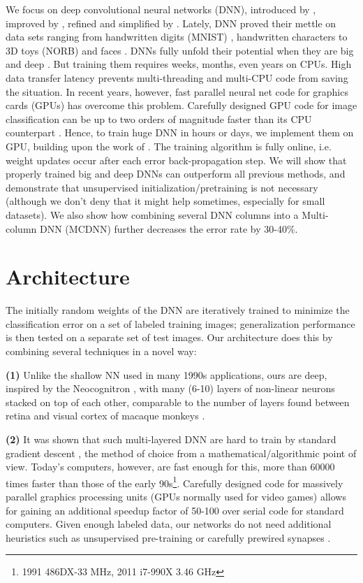 \documentclass[a4paper]{article}
\begin{document}
We focus on deep convolutional neural networks (DNN), introduced by \cite{fukushima:1980}, improved by \cite{lecun:1998}, refined and simplified by \cite{behnke:2003,simard:2003,Ciresan:2011a}. Lately, DNN proved their mettle on data sets ranging from handwritten digits (MNIST) \cite{Ciresan:2010,Ciresan:2011a}, handwritten characters \cite{Ciresan:2011c} to 3D toys (NORB) and faces \cite{strigl:2010}. DNNs fully unfold their potential when they are big and deep \cite{Ciresan:2011a}. But training them requires weeks, months, even years on CPUs. High data transfer latency prevents multi-threading and multi-CPU code from saving the situation. In recent years, however, fast parallel neural net code for graphics cards (GPUs) has overcome this problem. Carefully designed GPU code for image classification can be up to two orders of magnitude faster than its CPU counterpart  \cite{uetz:2009,strigl:2010}. Hence, to train huge DNN in hours or days, we implement them on GPU, building upon the work of \cite{Ciresan:2010,Ciresan:2011a}. The training algorithm is fully online, i.e. weight updates occur after each error back-propagation step.
We will show that properly trained big and deep DNNs can outperform all previous methods, and demonstrate that unsupervised  initialization/pretraining is not necessary (although we don't deny that it might help sometimes, especially for small datasets).  We also show how combining several DNN columns into a Multi-column DNN (MCDNN) further decreases the error rate by 30-40\%. 


\section{Architecture}

The initially random weights of the DNN are iteratively trained to minimize the classification error on a set of labeled training images; generalization performance is then tested on a separate set of test images. Our architecture does this by combining several techniques in a novel way:

{\bf (1)}
Unlike the shallow NN used in many 1990s applications, ours are deep, inspired by the Neocognitron \cite{fukushima:1980}, with many (6-10) layers of non-linear neurons stacked on top of each other, comparable to the number of layers found between retina and visual cortex of macaque monkeys \cite{Bichot:05}.

{\bf (2)}
It was shown \cite{Hochreiter:01book} that such multi-layered DNN are hard to train by standard gradient descent \cite{Werbos:74,LeCun:85,Rumelhart:86}, the method of choice from a mathematical/algorithmic point of view. Today's computers, however, are fast enough for this, more than 60000 times faster than those of the early 90s\footnote{1991 486DX-33 MHz, 2011 i7-990X 3.46 GHz}. Carefully designed code for massively parallel graphics processing units (GPUs normally used for video games) allows for gaining an additional speedup factor of 50-100 over serial code for standard computers.
Given enough labeled data, our networks do not need additional heuristics such as unsupervised pre-training \cite{Salakhutdinov:2007,ranzato:2007,bengio:2007,erhan:2010} or carefully prewired synapses \cite{Riesenhuber:1999,Serre:2007}.
\end{document}
